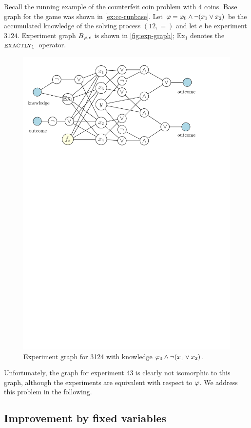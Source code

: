 \begin{example}
Recall the running example of the counterfeit coin problem with 4 coins.
Base graph for the game was shown in \autoref{ex:cc-runbase}.
Let $\varphi=\varphi_0\wedge\neg(x_1\vee x_2)$ be the accumulated knowledge
  of the solving process $(12, =)$ and let $e$ be experiment $3124$.
Experiment graph $B_{\varphi, e}$ is shown in \autoref{fig:exp-graph};
  Ex$_1$ denotes the $\textsc{exactly}_{1}\:$ operator.
\begin{figure}[h]
\begin{center}
\includegraphics[width=.7\textwidth]{pictures/exp-graph.pdf}
\caption{Experiment graph for 3124 with knowledge $\varphi_0\wedge\neg(x_1\vee x_2)$.}
\label{fig:exp-graph}
\end{center}
\end{figure}

Unfortunately, the graph for experiment 43 is clearly not isomorphic to this graph,
although the experiments are equivalent with respect to $\varphi$.
We address this problem in the following.\eqed
\end{example}

\subsection{Improvement by fixed variables}

